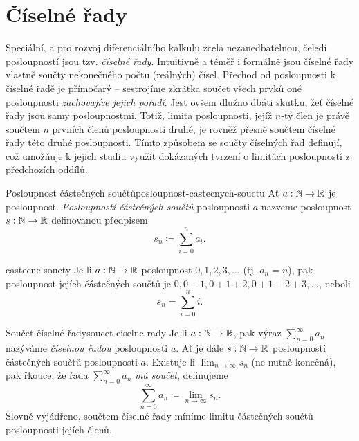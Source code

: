\section{Číselné řady}
\label{sec:ciselne-rady}

Speciální, a pro rozvoj diferenciálního kalkulu zcela nezanedbatelnou, čeledí
posloupností jsou tzv. \emph{číselné řady}. Intuitivně a téměř i formálně jsou
číselné řady vlastně součty nekonečného počtu (reálných) čísel. Přechod od
posloupnosti k číselné řadě je přímočarý -- sestrojíme zkrátka součet všech
prvků oné posloupnosti \emph{zachovajíce jejich pořadí}. Jest ovšem dlužno dbáti
skutku, žeť číselné řady jsou samy posloupnostmi. Totiž, limita posloupnosti,
jejíž $n$-tý člen je právě součtem $n$ prvních členů posloupnosti druhé, je
rovněž přesně součtem číselné řady této druhé posloupnosti. Tímto způsobem se
součty číselných řad definují, což umožňuje k jejich studiu využít dokázaných
tvrzení o limitách posloupností z předchozích oddílů.

\begin{definition}{Posloupnost částečných součtů}{posloupnost-castecnych-souctu}
 Ať $a:\mathbb{N} \to \mathbb{R}$ je posloupnost. \emph{Posloupností částečných součtů}
 posloupnosti $a$ nazveme posloupnost $s:\mathbb{N} \to \mathbb{R}$ definovanou předpisem
 \[
  s_n \coloneqq \sum_{i = 0}^{n} a_i.
 \]
\end{definition}

\begin{example}{}{castecne-soucty}
 Je-li $a:\mathbb{N} \to \mathbb{R}$ posloupnost $0,1,2,3,\ldots$ (tj. $a_n = n$), pak
 posloupnost jejích částečných součtů je $0,0+1,0+1+2,0+1+2+3,\ldots$, neboli
 \[
  s_n = \sum_{i=0}^{n} i.
 \]
\end{example}

\begin{definition}{Součet číselné řady}{soucet-ciselne-rady}
 Je-li $a:\mathbb{N} \to \mathbb{R}$, pak výraz $\sum_{n=0}^{\infty} a_n$ nazýváme
 \emph{číselnou řadou} posloupnosti $a$. Ať je dále $s:\mathbb{N} \to \mathbb{R}$ posloupností
 částečných součtů posloupnosti $a$. Existuje-li $\lim_{n \to \infty} s_n$ (ne
 nutně konečná), pak řkouce, že řada $\sum_{n=0}^{\infty} a_n$ \emph{má součet},
 definujeme
 \[
  \sum_{n=0}^{\infty} a_n \coloneqq \lim_{n \to \infty} s_n.
 \]
 Slovně vyjádřeno, součtem číselné řady míníme limitu částečných součtů
 posloupnosti jejích členů.
\end{definition}

